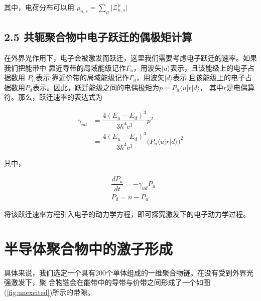 \documentclass[12pt,]{report}
\begin{document}
\noindent
其中，电荷分布可以用
\(\rho_{n,s} = \displaystyle\sum\limits_{\mu} \big| \mathcal{Z}_{n,s}^{\mu} \big|\)

\section{2.5
共轭聚合物中电子跃迁的偶极矩计算}\label{ux5171ux8f6dux805aux5408ux7269ux4e2dux7535ux5b50ux8dc3ux8fc1ux7684ux5076ux6781ux77e9ux8ba1ux7b97}

在外界光作用下，电子会被激发而跃迁，这里我们需要考虑电子跃迁的速率。如果我们把能带中
靠近导带的局域能级记作\(\Gamma_u\)，用波矢\(|u\rangle\)表示，且该能级上的电子占据数用
\(P_U\)表示;靠近价带的局域能级记作\(\Gamma_d\)，用波矢\(|d\rangle\)表示,且该能级上的电子占
据数用\(P_d\)表示。因此，跃迁能级之间的电偶极矩为\(p = P_u \langle u | r | d \rangle\)，
其中\(r\)是电偶算符。那么，跃迁速率的表达式为

\begin{equation}
\begin{aligned}
\gamma_{ud} &= \dfrac{4(E_u-E_d)^3}{3\hbar^4c^3} p^2 \\
            &= \dfrac{4(E_u-E_d)^3}{3\hbar^4c^3} \big( P_u \langle u | r | d
            \rangle\big)^2
\end{aligned}
\end{equation}

其中，

\begin{equation}
\begin{aligned}
&\dfrac{dP_u}{dt} = -\gamma_{ud}P_u\\
&P_d = n - P_u
\end{aligned}
\end{equation}

将该跃迁速率方程引入电子的动力学方程，即可探究激发下的电子动力学过程。

\clearpage

\pagestyle{fancy}

\chapter{半导体聚合物中的激子形成}\label{ux534aux5bfcux4f53ux805aux5408ux7269ux4e2dux7684ux6fc0ux5b50ux5f62ux6210}

\lhead{}  \rhead{}

具体来说，我们选定一个具有200个单体组成的一维聚合物链。在没有受到外界光强激发下，聚
合物链会在能带中的导带与价带之间形成了一个如图(\ref{fig:unexcited})所示的带隙。
\end{document}

